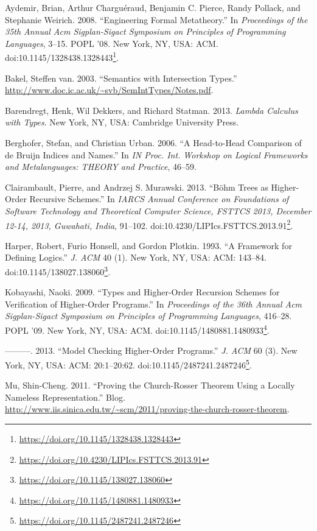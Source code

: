 \documentclass[a4paper, 12pt, twoside]{style/ociamthesis}
\theoremstyle{plain}
\theoremstyle{definition}
\theoremstyle{remark}
\renewcommand{\href}[2]{#2\footnote{\url{#1}}}
\begin{document}
\hypertarget{ref-aydemir08}{}
Aydemir, Brian, Arthur Charguéraud, Benjamin C. Pierce, Randy Pollack,
and Stephanie Weirich. 2008. ``Engineering Formal Metatheory.'' In
\emph{Proceedings of the 35th Annual Acm Sigplan-Sigact Symposium on
Principles of Programming Languages}, 3--15. POPL '08. New York, NY,
USA: ACM.
doi:\href{https://doi.org/10.1145/1328438.1328443}{10.1145/1328438.1328443}.

\hypertarget{ref-bakel}{}
Bakel, Steffen van. 2003. ``Semantics with Intersection Types.''
\url{http://www.doc.ic.ac.uk/~svb/SemIntTypes/Notes.pdf}.

\hypertarget{ref-barendregt13}{}
Barendregt, Henk, Wil Dekkers, and Richard Statman. 2013. \emph{Lambda
Calculus with Types}. New York, NY, USA: Cambridge University Press.

\hypertarget{ref-berghofer06}{}
Berghofer, Stefan, and Christian Urban. 2006. ``A Head-to-Head
Comparison of de Bruijn Indices and Names.'' In \emph{IN Proc. Int.
Workshop on Logical Frameworks and Metalanguages: THEORY and Practice},
46--59.

\hypertarget{ref-clairambault13}{}
Clairambault, Pierre, and Andrzej S. Murawski. 2013. ``Böhm Trees as
Higher-Order Recursive Schemes.'' In \emph{IARCS Annual Conference on
Foundations of Software Technology and Theoretical Computer Science,
FSTTCS 2013, December 12-14, 2013, Guwahati, India}, 91--102.
doi:\href{https://doi.org/10.4230/LIPIcs.FSTTCS.2013.91}{10.4230/LIPIcs.FSTTCS.2013.91}.

\hypertarget{ref-harper93}{}
Harper, Robert, Furio Honsell, and Gordon Plotkin. 1993. ``A Framework
for Defining Logics.'' \emph{J. ACM} 40 (1). New York, NY, USA: ACM:
143--84.
doi:\href{https://doi.org/10.1145/138027.138060}{10.1145/138027.138060}.

\hypertarget{ref-kobayashi09}{}
Kobayashi, Naoki. 2009. ``Types and Higher-Order Recursion Schemes for
Verification of Higher-Order Programs.'' In \emph{Proceedings of the
36th Annual Acm Sigplan-Sigact Symposium on Principles of Programming
Languages}, 416--28. POPL '09. New York, NY, USA: ACM.
doi:\href{https://doi.org/10.1145/1480881.1480933}{10.1145/1480881.1480933}.

\hypertarget{ref-kobayashi13}{}
---------. 2013. ``Model Checking Higher-Order Programs.'' \emph{J. ACM}
60 (3). New York, NY, USA: ACM: 20:1--20:62.
doi:\href{https://doi.org/10.1145/2487241.2487246}{10.1145/2487241.2487246}.

\hypertarget{ref-shing-cheng}{}
Mu, Shin-Cheng. 2011. ``Proving the Church-Rosser Theorem Using a
Locally Nameless Representation.'' Blog.
\url{http://www.iis.sinica.edu.tw/~scm/2011/proving-the-church-rosser-theorem}.
\end{document}
